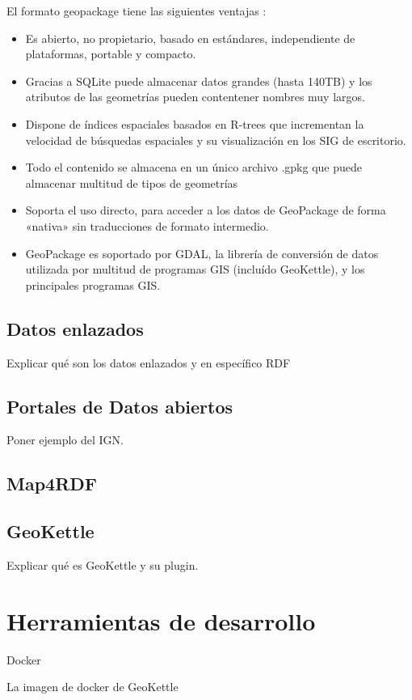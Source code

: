El formato geopackage tiene las siguientes ventajas \cite{shapefile-no}:
\begin{itemize}

    \item Es abierto, no propietario, basado en estándares, independiente de plataformas,
        portable y compacto.

    \item Gracias a SQLite puede almacenar datos grandes (hasta 140TB)\cite{sqlite-limits} y los atributos de
        las geometrías pueden contentener nombres muy largos.

    \item Dispone de índices espaciales basados en R-trees \cite{rtree} que incrementan la velocidad de búsquedas
        espaciales y su visualización en los SIG de escritorio.
       
    \item Todo el contenido se almacena en un único archivo .gpkg que puede almacenar multitud de tipos de
        geometrías

    \item Soporta el uso directo, para acceder a los datos de GeoPackage de forma «nativa» sin traducciones de
        formato intermedio.

    \item GeoPackage es soportado por GDAL\cite{gdal}, la librería de conversión de datos utilizada por multitud
        de programas GIS (incluído GeoKettle), y los principales programas GIS.
\end{itemize}


\subsection{Datos enlazados} Explicar qué son los datos enlazados y en específico RDF

\subsection{Portales de Datos abiertos} Poner ejemplo del IGN.

\subsection{Map4RDF}


\subsection{GeoKettle} Explicar qué es GeoKettle y su plugin.

\section{Herramientas de desarrollo} Docker

La imagen de docker de GeoKettle


